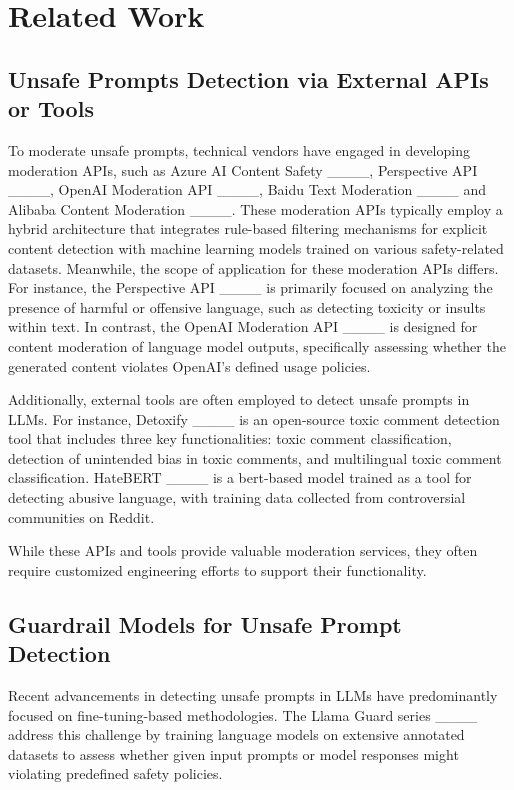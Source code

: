 \section{Related Work}
\subsection{Unsafe Prompts Detection via External APIs or Tools}
To moderate unsafe prompts, technical vendors have engaged in developing moderation APIs, such as Azure AI Content Safety ____, Perspective API ____, OpenAI Moderation API ____, Baidu Text Moderation ____ and Alibaba Content Moderation ____. These moderation APIs typically employ a hybrid architecture that integrates rule-based filtering mechanisms for explicit content detection with machine learning models trained on various safety-related datasets. Meanwhile, the scope of application for these moderation APIs differs. For instance, the Perspective API ____ is primarily focused on analyzing the presence of harmful or offensive language, such as detecting toxicity or insults within text. In contrast, the OpenAI Moderation API ____ is designed for content moderation of language model outputs, specifically assessing whether the generated content violates OpenAI's defined usage policies.


Additionally, external tools are often employed to detect unsafe prompts in LLMs. For instance, Detoxify ____ is an open-source toxic comment detection tool that includes three key functionalities: toxic comment classification, detection of unintended bias in toxic comments, and multilingual toxic comment classification. HateBERT ____ is a bert-based model trained as a tool for detecting abusive language, with training data collected from controversial communities on Reddit. 

While these APIs and tools provide valuable moderation services, they often require customized engineering efforts to support their functionality.

\subsection{Guardrail Models for Unsafe Prompt Detection}
Recent advancements in detecting unsafe prompts in LLMs have predominantly focused on fine-tuning-based methodologies. The Llama Guard series ____ address this challenge by training language models on extensive annotated datasets to assess whether given input prompts or model responses might violating predefined safety policies. 


